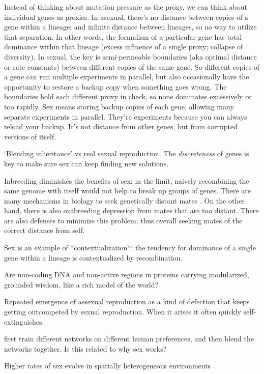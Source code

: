 Instead of thinking about mutation pressure as the proxy, we can think about individual genes as proxies. In asexual, there's no distance between copies of a gene within a lineage; and infinite distance between lineages, so no way to utilize that separation. In other words, the formalism of a particular gene has total dominance within that lineage (excess influence of a single proxy; collapse of diversity). In sexual, the key is semi-permeable boundaries (aka optimal distance or rate constants) between different copies of the same gene. So different copies of a gene can run multiple experiments in parallel, but also occasionally have the opportunity to restore a backup copy when something goes wrong. The boundaries hold each different proxy in check, so none dominates excessively or too rapidly. Sex means storing backup copies of each gene, allowing many separate experiments in parallel. They're experiments because you can always reload your backup. It's not distance from other genes, but from corrupted versions of itself.

`Blending inheritance' vs real sexual reproduction. The \textit{discreteness} of genes is key to make sure sex can keep finding new solutions.


Inbreeding diminishes the benefits of sex: in the limit, naively recombining the same genome with itself would not help to break up groups of genes. There are many mechanisms in biology to seek genetically distant mates \citep{fujii2016non, pusey1996inbreeding, penn2002scent}. On the other hand, there is also outbreeding depression from mates that are too distant. There are also defenses to minimize this problem; thus overall seeking mates of the correct distance from self.

Sex is an example of *contextualization*: the tendency for dominance of a single gene within a lineage is contextualized by recombination.

Are non-coding DNA and non-active regions in proteins carrying modularized, grounded wisdom, like a rich model of the world?



Repeated emergence of assexual reproduction as a kind of defection that keeps getting outcompeted by sexual reproduction. When it arises it often quickly self-extinguishes.

\cite{rame2024rewarded} first train different networks on different human preferences, and then blend the networks together. Is this related to why sex works?

Higher rates of sex evolve in spatially heterogeneous environments \citep{becks2010higher}.



